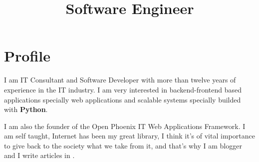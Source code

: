 \documentclass[11pt,a4paper,sans]{moderncv}
\title{Software Engineer}
\begin{document}
\maketitle

\section{Profile}
I am IT Consultant and Software Developer with more than
twelve years of experience in the IT industry. I am very interested in
backend-frontend based applications specially web applications and scalable
systems specially builded with {\bfseries Python}.

I am also the founder of 
the Open Phoenix IT Web Applications Framework. I am self taught, Internet has been my great library, I think it's of
vital importance to give back to the society what we take from it, and that's
why I am blogger and I write articles in .
\end{document}
